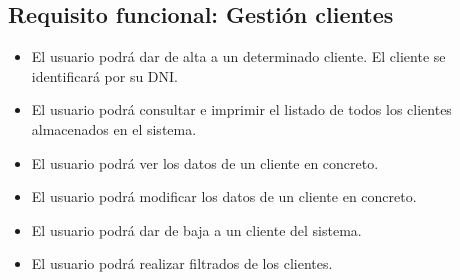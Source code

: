 \subsection{Requisito funcional: Gestión clientes}

\begin{itemize}
 \item El usuario podrá dar de alta a un determinado cliente. El cliente se identificará por su DNI. 
 \item El usuario podrá consultar e imprimir el listado de todos los clientes almacenados en el sistema.
 \item El usuario podrá ver los datos de un cliente en concreto.
 \item El usuario podrá modificar los datos de un cliente en concreto.
 \item El usuario podrá dar de baja a un cliente del sistema.
 \item El usuario podrá realizar filtrados de los clientes.
\end{itemize}



